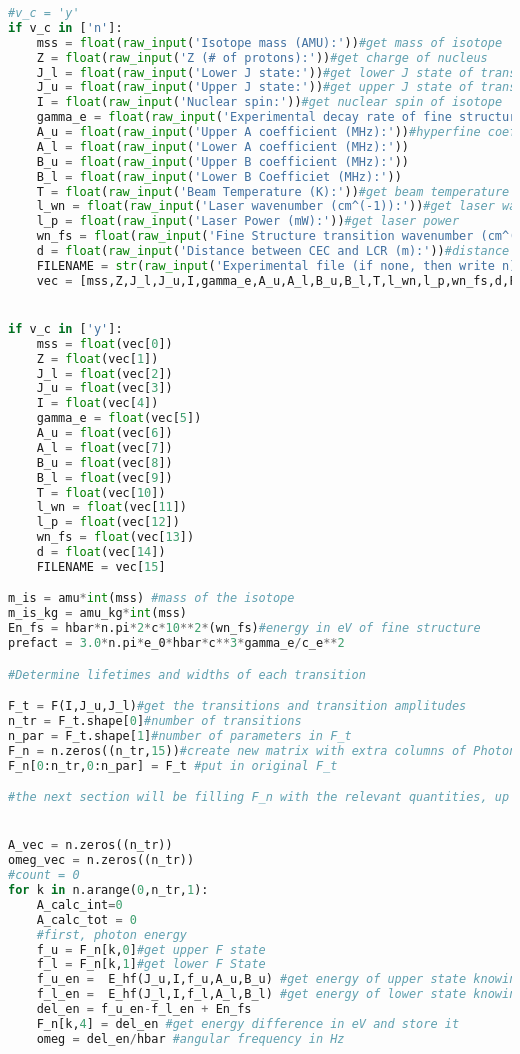 {\begin{lstlisting}[language=Python,breaklines]
#v_c = 'y'
if v_c in ['n']:
	mss = float(raw_input('Isotope mass (AMU):'))#get mass of isotope
	Z = float(raw_input('Z (# of protons):'))#get charge of nucleus
	J_l = float(raw_input('Lower J state:'))#get lower J state of transition
	J_u = float(raw_input('Upper J state:'))#get upper J state of transition
	I = float(raw_input('Nuclear spin:'))#get nuclear spin of isotope
	gamma_e = float(raw_input('Experimental decay rate of fine structure transition (Hz):'))
	A_u = float(raw_input('Upper A coefficient (MHz):'))#hyperfine coefficients
	A_l = float(raw_input('Lower A coefficient (MHz):'))
	B_u = float(raw_input('Upper B coefficient (MHz):'))
	B_l = float(raw_input('Lower B Coefficiet (MHz):')) 
	T = float(raw_input('Beam Temperature (K):'))#get beam temperature
	l_wn = float(raw_input('Laser wavenumber (cm^(-1)):'))#get laser wavelength
	l_p = float(raw_input('Laser Power (mW):'))#get laser power
	wn_fs = float(raw_input('Fine Structure transition wavenumber (cm^(-1)):'))
	d = float(raw_input('Distance between CEC and LCR (m):'))#distance over which optical pumping is problematic
	FILENAME = str(raw_input('Experimental file (if none, then write n)'))
	vec = [mss,Z,J_l,J_u,I,gamma_e,A_u,A_l,B_u,B_l,T,l_wn,l_p,wn_fs,d,FILENAME]


if v_c in ['y']:
	mss = float(vec[0])
	Z = float(vec[1])
	J_l = float(vec[2])
	J_u = float(vec[3])
	I = float(vec[4])
	gamma_e = float(vec[5])
	A_u = float(vec[6])
	A_l = float(vec[7])
	B_u = float(vec[8])
	B_l = float(vec[9])
	T = float(vec[10])
	l_wn = float(vec[11])
	l_p = float(vec[12])
	wn_fs = float(vec[13])
	d = float(vec[14])
	FILENAME = vec[15]

m_is = amu*int(mss) #mass of the isotope
m_is_kg = amu_kg*int(mss)
En_fs = hbar*n.pi*2*c*10**2*(wn_fs)#energy in eV of fine structure
prefact = 3.0*n.pi*e_0*hbar*c**3*gamma_e/c_e**2

#Determine lifetimes and widths of each transition

F_t = F(I,J_u,J_l)#get the transitions and transition amplitudes
n_tr = F_t.shape[0]#number of transitions
n_par = F_t.shape[1]#number of parameters in F_t
F_n = n.zeros((n_tr,15))#create new matrix with extra columns of Photon energy, Energy width, lifetime, saturation intensity, saturation parameter 
F_n[0:n_tr,0:n_par] = F_t #put in original F_t

#the next section will be filling F_n with the relevant quantities, up until A


A_vec = n.zeros((n_tr))
omeg_vec = n.zeros((n_tr))
#count = 0
for k in n.arange(0,n_tr,1):
	A_calc_int=0
	A_calc_tot = 0
	#first, photon energy
	f_u = F_n[k,0]#get upper F state
	f_l = F_n[k,1]#get lower F State
	f_u_en =  E_hf(J_u,I,f_u,A_u,B_u) #get energy of upper state knowing the fine structure energy
	f_l_en =  E_hf(J_l,I,f_l,A_l,B_l) #get energy of lower state knowing the fine structure energy
	del_en = f_u_en-f_l_en + En_fs
	F_n[k,4] = del_en #get energy difference in eV and store it 
	omeg = del_en/hbar #angular frequency in Hz
	

\end{lstlisting}}
